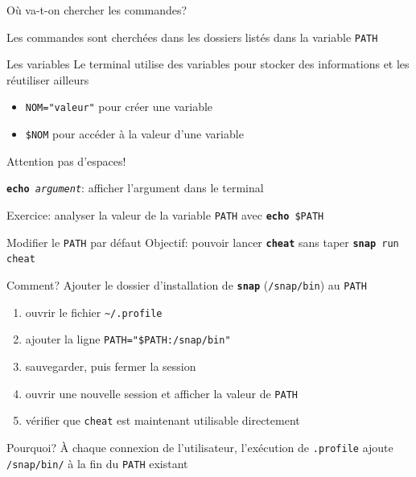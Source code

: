 \documentclass[
aspectratio=169 %
]{beamer}
\newcommand{\cmd}[1]{\texttt{\textbf{#1}}}
\newcommand{\args}[1]{\texttt{\textit{#1}}}
\begin{document}
\begin{frame}{Où va-t-on chercher les commandes?}

    Les commandes sont cherchées dans les dossiers listés dans la variable
    \texttt{PATH}
    \bigskip

    \begin{block}{Les variables}
        Le terminal utilise des variables pour stocker des informations et les
        réutiliser ailleurs
        \smallskip
        \begin{itemize}
            \item \texttt{NOM="valeur"} pour créer une variable
            \item \texttt{\$NOM} pour accéder à la valeur d'une variable
        \end{itemize}

        \smallskip
        Attention pas d'espaces!
    \end{block}

    \bigskip
    \cmd{echo}\args{ argument}: afficher l'argument dans le terminal

    \bigskip
    Exercice: analyser la valeur de la variable \texttt{PATH} avec
    \cmd{echo}\texttt{ \$PATH}
\end{frame}

\begin{frame}{Modifier le \texttt{PATH} par défaut}
    \alert{Objectif:} pouvoir lancer \cmd{cheat} sans taper \cmd{snap}\texttt{
        run cheat}

    \medskip
    \alert{Comment?} Ajouter le dossier d'installation de \cmd{snap}
    (\texttt{/snap/bin}) au
    \texttt{PATH}

    \medskip
    \begin{enumerate}
        \item ouvrir le fichier \texttt{\textasciitilde/.profile}
        \item ajouter la ligne \texttt{PATH="\$PATH:/snap/bin"}
        \item sauvegarder, puis fermer la session
        \item ouvrir une nouvelle session et afficher la valeur de \texttt{PATH}
        \item vérifier que \texttt{cheat} est maintenant utilisable directement
    \end{enumerate}

    \bigskip
    \alert{Pourquoi?} À chaque connexion de l'utilisateur, l'exécution de
    \texttt{.profile} ajoute \texttt{/snap/bin/} à la fin du \texttt{PATH}
    existant

\end{frame}
\end{document}
